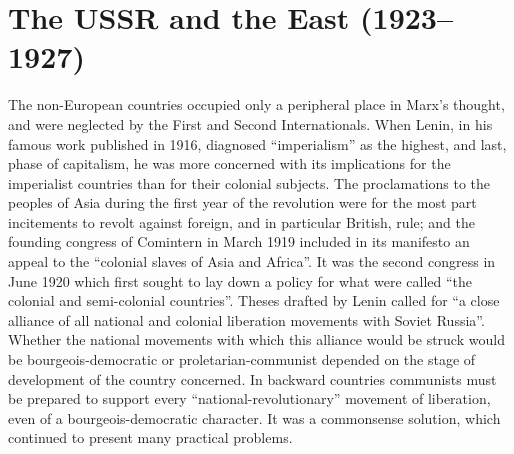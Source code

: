 \chapter{The USSR and the East (1923--1927)}

The non-European countries occupied only a peripheral place in Marx's thought, and were neglected by the First and Second Internationals. When Lenin, in his famous work published in 1916, diagnosed ``imperialism'' as the highest, and last, phase of capitalism, he was more concerned with its implications for the imperialist countries than for their colonial subjects. The proclamations to the peoples of Asia during the first year of the revolution were for the most part incitements to revolt against foreign, and in particular British, rule; and the founding congress of Comintern in March 1919 included in its manifesto an appeal to the ``colonial slaves of Asia and Africa''. It was the second congress in June 1920 which first sought to lay down a policy for what were called ``the colonial and semi-colonial countries''. Theses drafted by Lenin called for ``a close alliance of all national and colonial liberation movements with Soviet Russia''. Whether the national movements with which this alliance would be struck would be bourgeois-democratic or proletarian-communist depended on the stage of development of the country concerned. In backward countries communists must be prepared to support every ``national-revolutionary'' movement of liberation, even of a bourgeois-democratic character. It was a commonsense solution, which continued to present many practical problems. 

